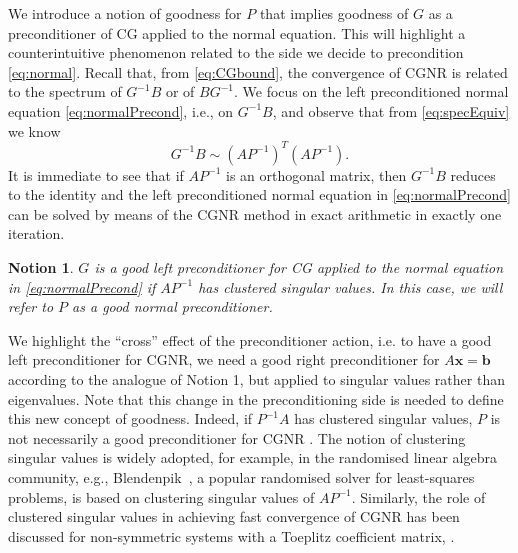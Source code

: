 \documentclass[hidelinks,onefignum,onetabnum]{siamart220329}
\newtheorem{nt}{Notion}
\let\vec\mathbf
\begin{document}
We introduce  a notion of goodness for $P$ that implies goodness of $G$ as a preconditioner of CG applied to the normal equation. This will highlight a counterintuitive phenomenon related to the side we decide to precondition \eqref{eq:normal}.
Recall that, from \eqref{eq:CGbound}, the convergence of CGNR is related to the spectrum of $G^{-1}B$ or of $BG^{-1}$. We focus on the left preconditioned normal equation \eqref{eq:normalPrecond}, i.e., on $G^{-1}B$, and observe that from \eqref{eq:specEquiv} we know
\begin{equation}
    \label{eq:crossSquare}
    G^{-1}B \sim (AP^{-1})^T(AP^{-1}).
\end{equation}
It is immediate to see that if $AP^{-1}$ is an orthogonal matrix, then $G^{-1}B$ reduces to the identity and the left preconditioned normal equation in \eqref{eq:normalPrecond} can be solved by means of the CGNR method {in exact arithmetic in exactly one iteration}.
\begin{nt}
    \label{nt:crosseyed}
    $G$ is a good left preconditioner for CG applied to the normal equation in \eqref{eq:normalPrecond} if $AP^{-1}$ has clustered singular values. In this case, we will refer to $P$ as a good normal preconditioner.
\end{nt}
We highlight the ``cross'' effect of the preconditioner action, i.e. to have a good left preconditioner for CGNR, we need a good right preconditioner for $A\vec{x} = \vec{b}$ according to the analogue of Notion 1, but applied to singular values rather than eigenvalues.
Note that this change in the preconditioning side is needed to define this new concept of goodness. Indeed, if $P^{-1}A$ has clustered singular values, $P$ is not necessarily a good preconditioner for CGNR \cite{Wathen}.
The notion of clustering singular values is widely adopted, for example, in the randomised linear algebra community, e.g., Blendenpik~\cite{avron2010blendenpik}, a popular randomised solver for least-squares problems, is based on clustering singular values of $AP^{-1}$. Similarly, the role of clustered singular values in achieving fast convergence of CGNR has been discussed for non-symmetric systems with a Toeplitz coefficient matrix, \cite{chan1993circulant}.
\end{document}

